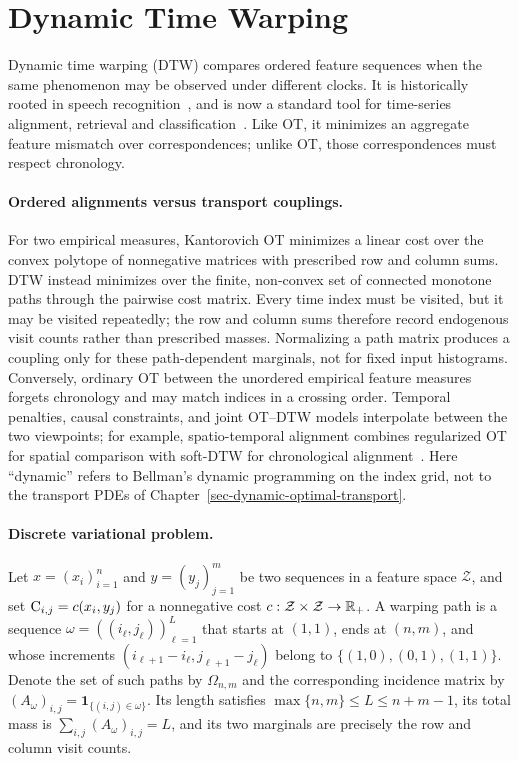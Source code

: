 \section{Dynamic Time Warping}\label{sec-dynamic-time-warping}

Dynamic time warping (DTW) compares ordered feature sequences when the same phenomenon may be observed under different clocks. It is historically rooted in speech recognition~\cite{Vintsyuk1968DTW,SakoeChiba1978DTW}, and is now a standard tool for time-series alignment, retrieval and classification~\cite{BerndtClifford1994DTW,Muller2007MusicMotion}. Like OT, it minimizes an aggregate feature mismatch over correspondences; unlike OT, those correspondences must respect chronology.

\paragraph{Ordered alignments versus transport couplings.}
For two empirical measures, Kantorovich OT minimizes a linear cost over the convex polytope of nonnegative matrices with prescribed row and column sums. DTW instead minimizes over the finite, non-convex set of connected monotone paths through the pairwise cost matrix. Every time index must be visited, but it may be visited repeatedly; the row and column sums therefore record endogenous visit counts rather than prescribed masses. Normalizing a path matrix produces a coupling only for these path-dependent marginals, not for fixed input histograms. Conversely, ordinary OT between the unordered empirical feature measures forgets chronology and may match indices in a crossing order. Temporal penalties, causal constraints, and joint OT--DTW models interpolate between the two viewpoints; for example, spatio-temporal alignment combines regularized OT for spatial comparison with soft-DTW for chronological alignment~\cite{JanatiCuturiGramfort2020STA}. Here ``dynamic'' refers to Bellman's dynamic programming on the index grid, not to the transport PDEs of Chapter~\ref{sec-dynamic-optimal-transport}.

\paragraph{Discrete variational problem.}
Let $x=(x_i)_{i=1}^n$ and $y=(y_j)_{j=1}^m$ be two sequences in a feature space $\mathcal Z$, and set $\mathrm{C}_{i,j}=c(x_i,y_j)$ for a nonnegative cost $c:\mathcal Z\times\mathcal Z\to\mathbb{R}_+$. A warping path is a sequence $\omega=((i_\ell,j_\ell))_{\ell=1}^L$ that starts at $(1,1)$, ends at $(n,m)$, and whose increments $(i_{\ell+1}-i_\ell,j_{\ell+1}-j_\ell)$ belong to $\{(1,0),(0,1),(1,1)\}$.
Denote the set of such paths by $\Omega_{n,m}$ and the corresponding incidence matrix by $(A_\omega)_{i,j}=\mathbf 1_{\{(i,j)\in\omega\}}$. Its length satisfies $\max\{n,m\}\leq L\leq n+m-1$, its total mass is $\sum_{i,j}(A_\omega)_{i,j}=L$, and its two marginals are precisely the row and column visit counts.

